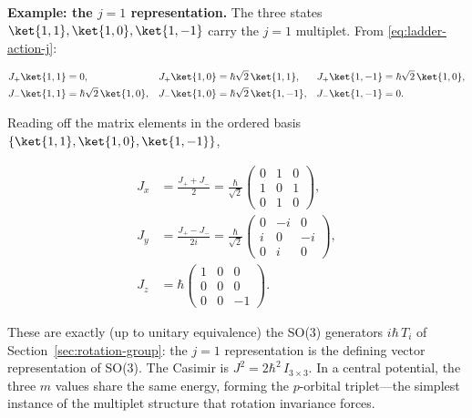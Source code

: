 \medskip\noindent\textbf{Example: the $j=1$ representation.} The three states $\ket{1,1},\ket{1,0},\ket{1,-1}$ carry the $j=1$ multiplet. From \eqref{eq:ladder-action-j}:
\begin{linenomath}
    \begin{align*}
        J_+\ket{1,1} &= 0, &
        J_+\ket{1,0} &= \hbar\sqrt{2}\,\ket{1,1}, &
        J_+\ket{1,-1} &= \hbar\sqrt{2}\,\ket{1,0},\\
        J_-\ket{1,1} &= \hbar\sqrt{2}\,\ket{1,0}, &
        J_-\ket{1,0} &= \hbar\sqrt{2}\,\ket{1,-1}, &
        J_-\ket{1,-1} &= 0.
    \end{align*}
\end{linenomath}
Reading off the matrix elements in the ordered basis $\{\ket{1,1},\ket{1,0},\ket{1,-1}\}$,
\begin{linenomath}
    \begin{align*}
        J_x &= \frac{J_++J_-}{2} = \frac{\hbar}{\sqrt{2}}
        \begin{pmatrix}
            0 & 1 & 0 \\
            1 & 0 & 1 \\
            0 & 1 & 0
        \end{pmatrix},\\
        J_y &= \frac{J_+-J_-}{2i} = \frac{\hbar}{\sqrt{2}}
        \begin{pmatrix}
            0 & -i & 0 \\
            i & 0 & -i \\
            0 & i & 0
        \end{pmatrix},\\
        J_z &= \hbar
        \begin{pmatrix}
            1 & 0 & 0 \\
            0 & 0 & 0 \\
            0 & 0 & -1
        \end{pmatrix}.
    \end{align*}
\end{linenomath}
These are exactly (up to unitary equivalence) the SO(3) generators $i\hbar\,T_i$ of Section~\ref{sec:rotation-group}: the $j=1$ representation is the defining vector representation of SO(3). The Casimir is $J^2 = 2\hbar^2\,I_{3\times3}$. In a central potential, the three $m$ values share the same energy, forming the $p$-orbital triplet---the simplest instance of the multiplet structure that rotation invariance forces.


